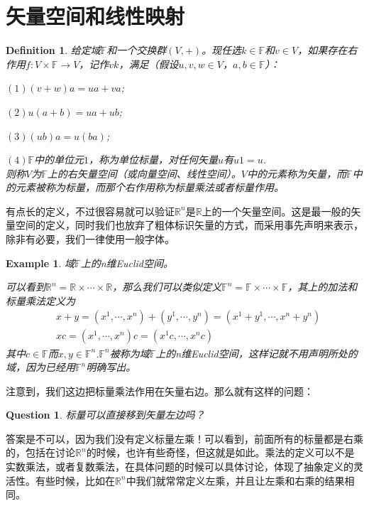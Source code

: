 \documentclass[11pt,a4paper,openany]{book}%
\theoremstyle{plain}%
\newtheorem{que}{Question}[chapter]%
\newtheorem{defi}{Definition}[chapter]%
\newtheorem{exa}{Example}[chapter]%
\newcommand{\NO}[1]{{$(#1)$}}%
\begin{document}
\section{矢量空间和线性映射}
\begin{defi}
给定域$\mathbb{F}$和一个交换群$(V,+)$。现任选$k \in \mathbb{F}$和$v \in V$，如果存在右作用$f:V\times \mathbb{F}\rightarrow V$，记作$vk$，满足（假设$u,v,w \in V$，$a,b \in \mathbb{F}$）：

\NO{1}$(v+w)a=ua+va$;

\NO{2}$u(a+b)=ua+ub$;

\NO{3}$(ub)a=u(ba)$;

\NO{4}$\mathbb{F}$中的单位元$1$，称为单位标量，对任何矢量$u$有$u1=u$.\\
则称$V$为$\mathbb{F}$上的右矢量空间（或向量空间、线性空间）。$V$中的元素称为矢量，而$\mathbb{F}$中的元素被称为标量，而那个右作用称为标量乘法或者标量作用。
\end{defi}
有点长的定义，不过很容易就可以验证$\mathbb{R}^{n}$是$\mathbb{R}$上的一个矢量空间。这是最一般的矢量空间的定义，同时我们也放弃了粗体标识矢量的方式，而采用事先声明来表示，除非有必要，我们一律使用一般字体。
\begin{exa}
域$\mathbb{F}$上的n维Euclid空间。

可以看到$\mathbb{R}^{n}=\mathbb{R}\times \cdots \times \mathbb{R}$，那么我们可以类似定义$\mathbb{F}^{n}=\mathbb{F}\times \cdots \times \mathbb{F}$，其上的加法和标量乘法定义为
\begin{equation*}
\begin{split}
&x+y=(x^{1},\cdots,x^{n})+(y^{1},\cdots,y^{n})=(x^{1}+y^1,\cdots,x^{n}+y^n)\\
&xc=(x^{1},\cdots,x^{n})c=(x^{1}c,\cdots,x^{n}c)
\end{split}
\end{equation*}
其中$c\in \mathbb{F}$而$x,y\in \mathbb{F}^{n}$.$\mathbb{F}^{n}$被称为域$\mathbb{F}$上的n维Euclid空间，这样记就不用声明所处的域，因为已经用$\mathbb{F}^{n}$明确写出。
\end{exa}
\indent 注意到，我们这边把标量乘法作用在矢量右边。那么就有这样的问题：
\begin{que}
标量可以直接移到矢量左边吗？
\end{que}

\indent 答案是不可以，因为我们没有定义标量左乘！可以看到，前面所有的标量都是右乘的，包括在讨论$\mathbb{R}^{n}$的时候，也许有些奇怪，但这就是如此。乘法的定义可以不是实数乘法，或者复数乘法，在具体问题的时候可以具体讨论，体现了抽象定义的灵活性。有些时候，比如在$\mathbb{R}^{n}$中我们就常常定义左乘，并且让左乘和右乘的结果相同。
\end{document}
